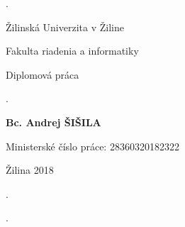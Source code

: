 \begin{titlepage}

\phantom.

\bigskip

\begin{center}
{\sc\LARGE Žilinská Univerzita v Žiline}
\medskip

{\sc\Large Fakulta riadenia a informatiky}

\vfill\vfill\vfill\vfill

{\sc\LARGE Diplomová práca}

\medskip

{\large\bf \nazovpraceSK}

\end{center}


\vfill\vfill\vfill\vfill


\phantom.\hfill
\begin{center}
{\large\bf Bc. Andrej ŠIŠILA}

\medskip

\medskip



\medskip
\bigskip

\medskip

Ministerské číslo práce: 28360320182322

\medskip

Žilina 2018

\end{center}
\hspace{1.7cm}\phantom.

\vspace{2.9cm}

\phantom.
\end{titlepage}






















\newpage



